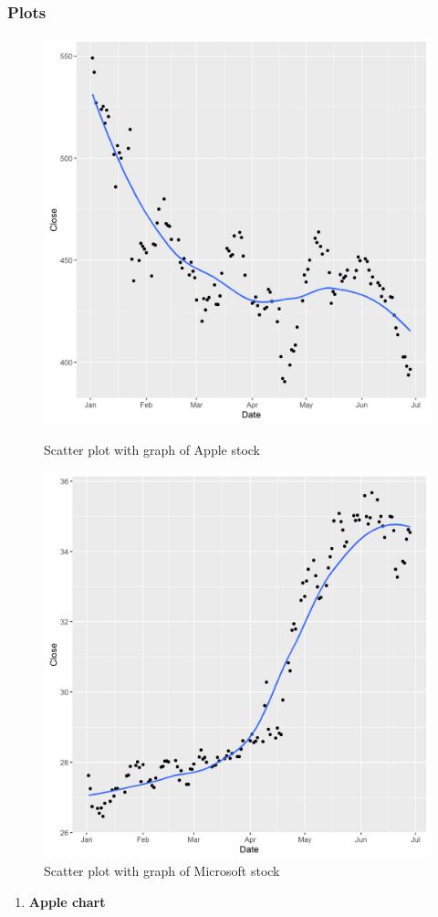\documentclass[paper=a4, fontsize=11pt]{scrartcl} %
\numberwithin{equation}{section} %
\numberwithin{figure}{section} %
\numberwithin{table}{section} %
\begin{document}
\subsubsection{Plots}
\begin{figure}[!htb]
  \includegraphics[width=\linewidth]{graph/AAPL5.png}
  \caption{Scatter plot with graph of Apple stock}
\endminipage\hfill
{}
  \includegraphics[width=\linewidth]{graph/MSFT5.png}
  \caption{Scatter plot with graph of Microsoft stock}
\endminipage\hfill

\end{figure}
\begin{enumerate}
\item {\bf Apple chart}
\end{enumerate}
\end{document}
